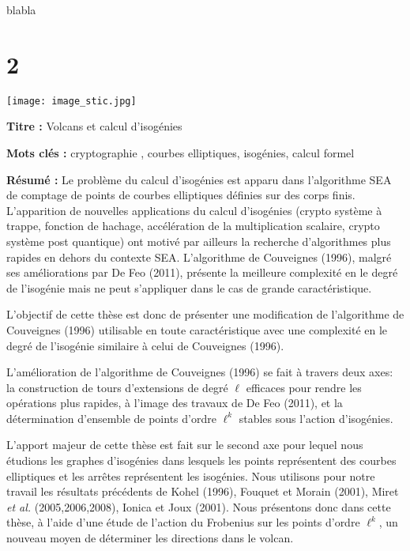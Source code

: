 \documentclass[a4paper, titlepage, 12pt]{book}
\makeatletter
\newcommand*{\cleartoleftpage}{%
  \clearpage
    \if@twoside
    \ifodd\c@page
      \hbox{}\newpage
      \if@twocolumn
        \hbox{}\newpage
      \fi
    \fi
  \fi
}
\newcommand{\titre}{Volcans et calcul d'isogénies}
\makeatother
\begin{document}
blabla

\chapter{2}



\cleartoleftpage
\pagestyle{empty}
\texttt{[image: image\_stic.jpg]}

\vspace{1ex}

\begin{breakbox}

\noindent\textbf{Titre : }\titre

\vspace{2ex}

\noindent\textbf{Mots clés : }cryptographie , courbes elliptiques, isogénies, 
calcul formel

\begin{multicols}{2}
\noindent\textbf{Résumé : }
Le problème du calcul d'isogénies est apparu dans l'algorithme SEA de comptage
de points de courbes elliptiques définies sur des corps finis. L'apparition de 
nouvelles applications du calcul d'isogénies (crypto système à trappe, fonction 
de hachage, accélération de la multiplication scalaire, crypto système post 
quantique) ont motivé par ailleurs la recherche d'algorithmes plus rapides en 
dehors du contexte SEA. L'algorithme de Couveignes (1996), malgré ses 
améliorations par De Feo (2011), présente la meilleure complexité en le 
degré de l'isogénie mais ne peut s'appliquer dans le cas de grande 
caractéristique.


L'objectif de cette thèse est donc de présenter une modification de 
l'algorithme de Couveignes (1996) utilisable en toute caractéristique avec une 
complexité en le degré de l'isogénie similaire à celui de Couveignes (1996).


L'amélioration de l'algorithme de Couveignes (1996) se fait à 
travers deux axes: la construction de tours d'extensions
de degré $\ell$ efficaces pour rendre les opérations plus rapides, à l'image 
des travaux de De Feo (2011), et la détermination d'ensemble de points d'ordre 
$\ell^k$ stables sous l'action d'isogénies.

L'apport majeur de cette thèse est fait sur le second axe pour lequel nous 
étudions les graphes d'isogénies dans lesquels les points représentent des 
courbes elliptiques et les arrêtes représentent les isogénies. Nous utilisons
pour notre travail les résultats précédents de Kohel (1996), Fouquet et Morain
(2001), Miret \emph{et al.} (2005,2006,2008), Ionica et Joux (2001). Nous 
présentons donc dans cette thèse, à l'aide d'une étude de l'action du Frobenius
sur les points d'ordre $\ell^k$, un nouveau moyen de déterminer les directions 
dans le volcan.



\end{multicols}
\end{breakbox}
\end{document}

